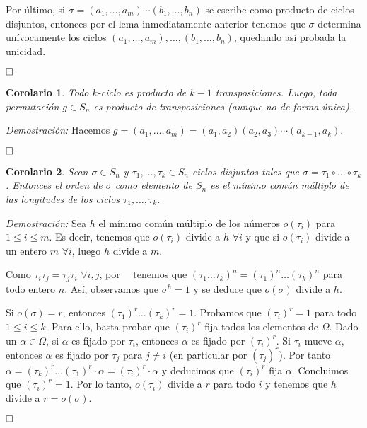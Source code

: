 \documentclass[12pt]{article}
\newtheorem{corolario}{Corolario}[theorem]
\begin{document}
Por último, si $\sigma = (a_{1}, \ldots, a_{m}) \cdots(b_{1}, \ldots, b_{n})$ se escribe como producto de ciclos disjuntos, entonces por el lema inmediatamente anterior tenemos que $\sigma$ determina unívocamente los ciclos $(a_{1}, \ldots, a_{m}), \ldots, (b_{1}, \ldots, b_{n})$, quedando así probada la unicidad.

$\hfill \square$

\begin{corolario} Todo $k$-ciclo es producto de $k-1$ transposiciones. Luego, toda permutación $g\in S_{n}$ es producto de transposiciones (aunque no de forma única).
\end{corolario}
\emph{Demostración: }
Hacemos $g = (a_{1}, \ldots, a_{m})=(a_{1},a_{2}) (a_{2},a_{3}) \cdots (a_{k-1},a_{k}).$

$\hfill \square$

\begin{corolario} 
Sean $\sigma \in S_{n}$ y $\tau_{1}, \ldots, \tau_{k} \in S_{n}$ ciclos disjuntos tales que $\sigma = \tau_{1} \circ \ldots \circ \tau_{k}$. Entonces el orden de $\sigma$ como elemento de $S_{n}$ es el mínimo común múltiplo de las longitudes de los ciclos $\tau_{1}, \ldots, \tau_{k}$.
\end{corolario} 
\emph{Demostración: }Sea $h$ el mínimo común múltiplo de los números $o(\tau_i)$ para $1 \leq i \leq m$. Es decir, tenemos que $o(\tau_i)$ divide a $h$ $\forall i$ y que si $o(\tau_i)$ divide a un entero $m$ $\forall i$, luego $h$ divide a $m$.

Como $\tau_i\tau_j = \tau_j \tau_i$ $\forall i,j$, por~~ tenemos que $(\tau_1 \ldots \tau_k)^n= (\tau_1)^n \ldots (\tau_k)^n$ para todo entero $n$. Así, observamos que $\sigma^h = 1$ y se deduce que $o(\sigma)$ divide a $h$.

Si $o(\sigma) = r$, entonces $(\tau_1)^r\ldots (\tau_k)^r = 1$. Probamos que $(\tau_i)^r=1$ para todo $1 \leq i \leq k$. Para ello, basta probar que $(\tau_i)^r$ fija todos los elementos de $\Omega$. Dado un $\alpha \in \Omega$, si $\alpha$ es fijado por $\tau_i$, entonces $\alpha$ es fijado por $(\tau_i)^r$. Si $\tau_i$ mueve $\alpha$, entonces $\alpha$ es fijado por $\tau_j$ para $j \neq i$ (en particular por $(\tau_j)^r$). Por tanto $\alpha = (\tau_k)^r \ldots (\tau_1)^r \cdot \alpha = (\tau_i)^r \cdot \alpha$ y deducimos que $(\tau_i)^r$ fija $\alpha$. Concluimos que $(\tau_i)^r = 1$. Por lo tanto, $o(\tau_i)$ divide a $r$ para todo $i$ y tenemos que $h$ divide a $r = o(\sigma).$


$\hfill \square$
\end{document}
